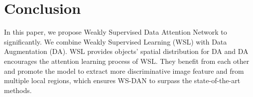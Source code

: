 \documentclass[10pt,twocolumn,letterpaper]{article}
\begin{document}
\section{Conclusion}
\label{sec:conclusion}
In this paper, we propose Weakly Supervised Data Attention Network to significantly. We combine Weakly Supervised Learning (WSL) with Data Augmentation (DA). WSL provides objects' spatial distribution for DA and DA encourages the attention learning process of WSL. They benefit from each other and promote the model to extract more discriminative image feature and from multiple local regions, which ensures WS-DAN to surpass the state-of-the-art methods.

{\small


}
\end{document}
